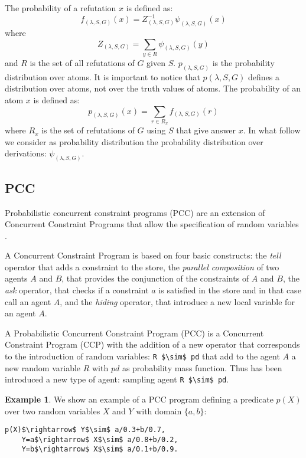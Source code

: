 \documentclass[letterpaper]{article}
\theoremstyle{plain}
\theoremstyle{definition}
\theoremstyle{remark}
\theoremstyle{definition}
\newtheorem{example}{Example}[section]
\begin{document}
The probability of a refutation $x$ is defined as:
$$f_{(\lambda,S,G)}(x)=Z_{(\lambda,S,G)}^{-1}\psi_{(\lambda,S,G)}(x) $$
where $$Z_{(\lambda,S,G)}=\sum_{y  \in R}\psi_{(\lambda,S,G)}(y) $$
and $R$ is the set of all refutations of $G$ given $S$.
$p_{(\lambda,S,G)}$ is the probability distribution over atoms. It is important to notice that $p(\lambda,S,G)$ defines a distribution over atoms, not over the truth values of atoms.
The probability of an atom $x$ is defined as:
$$p_{(\lambda,S,G)}(x)=\sum_{r \in R_x}f_{(\lambda,S,G)}(r) $$
where $R_x$ is the set of refutations of $G$ using $S$ that give answer $x$.
In what follow we consider as probability distribution the probability distribution over derivations:  $\psi_{(\lambda,S,G)}$. 

\subsection{PCC}
Probabilistic concurrent constraint programs (PCC) are an extension of Concurrent Constraint Programs \cite{Sar93,ccpSurvey} that 
allow the specification of random variables \cite{PCC}.

A Concurrent Constraint Program is based on four basic constructs: the \emph{tell} operator that adds a constraint to the store, the  \emph{parallel composition} of two agents $A$ and $B$, that provides the conjunction of the constraints of $A$ and $B$, the  \emph{ask} operator, that checks if a constraint $a$ is satisfied in the store and in that case call an agent $A$, and the  \emph{hiding} operator, that introduce a new local variable for an agent $A$. 

A Probabilistic Concurrent Constraint Program (PCC) is a  Concurrent Constraint Program (CCP) with the addition of a new operator that corresponds to the introduction of random variables: \lstinline[mathescape=true]{R $\sim$ pd} that add to the agent $A$ a new random variable $R$ with $pd$ as probability mass function. Thus has been introduced a new type of agent: sampling agent \lstinline[mathescape=true]{R $\sim$ pd}.

\begin{example}
We show an example of a PCC program defining a predicate $p(X)$ over two random variables $X$ and $Y$ with domain $\{a,b\}$:
\begin{lstlisting}[mathescape=true]
p(X)$\rightarrow$ Y$\sim$ a/0.3+b/0.7, 
	Y=a$\rightarrow$ X$\sim$ a/0.8+b/0.2,
	Y=b$\rightarrow$ X$\sim$ a/0.1+b/0.9.
\end{lstlisting}
\end{example}
\end{document}
